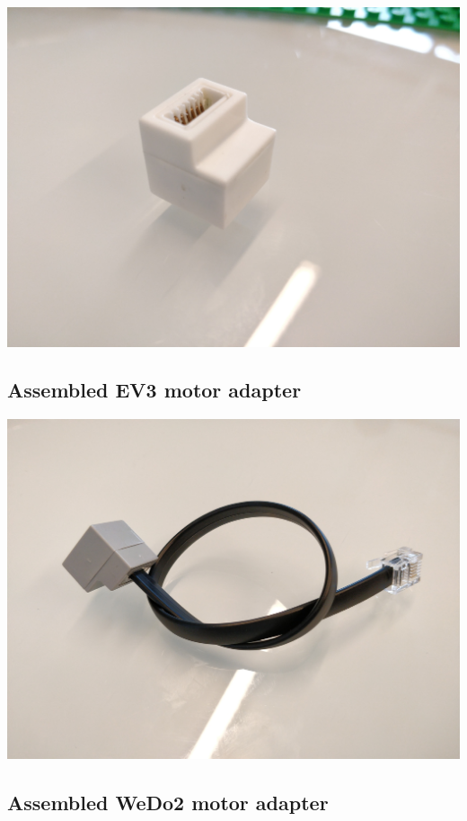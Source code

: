 \documentclass[a4paper,12pt]{article}
\begin{document}
\includegraphics[width=13.5cm]{wedo2-sensor-adapter.jpg}

\subsection{Assembled EV3 motor adapter}

\includegraphics[width=13.5cm]{ev3-motor-adapter.jpg}

\subsection{Assembled WeDo2 motor adapter}
\end{document}
